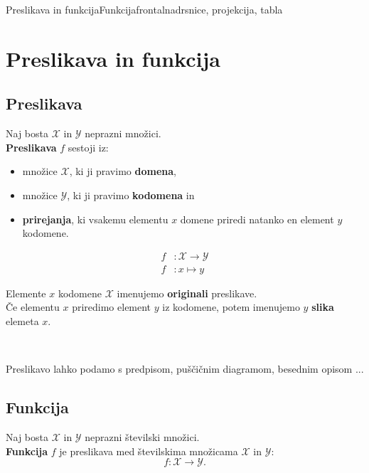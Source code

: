 \begin{priprava}{1}{}{Preslikava in funkcija}{Funkcija}{frontalna}{drsnice, projekcija, tabla}


\section{Preslikava in funkcija}

    \subsection*{Preslikava}

        Naj bosta $\mathcal{X}$ in $\mathcal{Y}$ neprazni množici. \\
        \textbf{Preslikava} $f$ sestoji iz:
        \begin{itemize}
            \item množice $\mathcal{X}$, ki ji pravimo \textbf{domena},
            \item množice $\mathcal{Y}$, ki ji pravimo \textbf{kodomena} in 
            \item \textbf{prirejanja}, ki vsakemu elementu $x$ domene priredi natanko en element $y$ kodomene.
        \end{itemize}

        $$\begin{aligned}
            f&: \mathcal{X}\to\mathcal{Y} \\ f&: x\mapsto y
        \end{aligned}  $$
    

        Elemente $x$ kodomene $\mathcal{X}$ imenujemo \textbf{originali} preslikave.
        \\ Če elementu $x$ priredimo element $y$ iz kodomene, potem imenujemo $y$ \textbf{slika} elemeta $x$.

        ~

        Preslikavo lahko podamo s predpisom, puščičnim diagramom, besednim opisom ...





    \subsection*{Funkcija}

        Naj bosta $\mathcal{X}$ in $\mathcal{Y}$ neprazni številski množici. \\
        \textbf{Funkcija} $f$ je preslikava med številskima množicama $\mathcal{X}$ in $\mathcal{Y}$:
        $$f: \mathcal{X}\to\mathcal{Y}.$$



\end{priprava}
